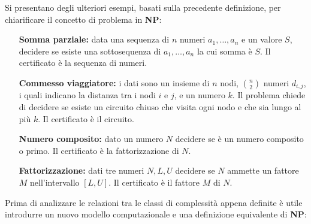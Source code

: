 Si presentano degli ulteriori esempi, basati sulla precedente definizione, per chiarificare il concetto di problema in \textbf{NP}:
\begin{enumerate}[align=left]
 \item[\textbf{Somma parziale:}] data una sequenza di $n$ numeri $a_1, \dots, a_n$ e un valore $S$, decidere se esiste una sottosequenza di $a_1, \dots, a_n$ la cui somma è $S$. Il certificato è la sequenza di numeri.
 \item[\textbf{Commesso viaggiatore:}] i dati sono un insieme di $n$ nodi, $\binom{n}{2}$ numeri $d_{i,j}$, i quali indicano la distanza tra i nodi $i$ e $j$, e un numero $k$.
 Il problema chiede di decidere se esiste un circuito chiuso che visita ogni nodo e che sia lungo al più $k$.
 Il certificato è il circuito.
 \item[\textbf{Numero composito:}] dato un numero $N$ decidere se è un numero composito o primo.
 Il certificato è la fattorizzazione di $N$.
 \item[\textbf{Fattorizzazione:}] dati tre numeri $N, L, U$ decidere se $N$ ammette un fattore $M$ nell'intervallo $\left[L,U\right]$.
 Il certificato è il fattore $M$ di $N$.
\end{enumerate}

Prima di analizzare le relazioni tra le classi di complessità appena definite è utile introdurre un nuovo modello computazionale e una definizione equivalente di \textbf{NP}:

